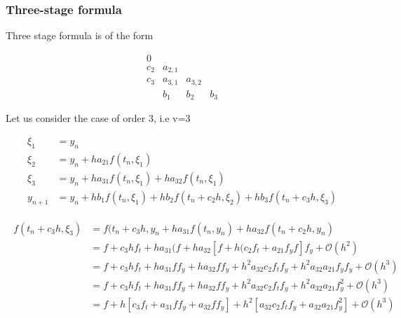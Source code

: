\documentclass[12pt,a4paper]{article}
\begin{document}
\subsubsection{Three-stage formula}

Three stage formula is of the form

\begin{equation*}
  \begin{array}{c|ccc}
    0       \\
    c_2       & a_{2,1}  \\
    c_3    & a_{3,1}   &  a_{3,2}  \\
    \hline
    \,        & b_1      & b_2     & b_3
  \end{array}
\end{equation*}

Let us consider the case of order 3, i.e v=3

\begin{align*}
\xi_1 &= y_n \\
\xi_2 &= y_n + ha_{21}f(t_n, \xi_1) \\
\xi_3 &= y_n + ha_{31}f(t_n, \xi_1) + ha_{32}f(t_n, \xi_1) \\
y_{n+1} &= y_n + hb_1f(t_n, \xi_1) + hb_2f(t_n + c_2h , \xi_2) + hb_3f(t_n + c_3h , \xi_3) 
\end{align*}

\begin{align*}
\begin{split}
f(t_n + c_3h, \xi_3) &= f(t_n + c_3h, y_n + ha_{31}f(t_n, y_n) + ha_{32}f(t_n + c_2h, y_n) \\
&=f + c_3hf_t + ha_{31} ( f + ha_{32}[ f + h (c_2 f_t + a_{21} f_yf ] f_y + \mathcal{O}(h^2) \\
&= f + c_3h f_t +  ha_{31} ff_y + ha_{32}ff_y + h^2 a_{32}c_2 f_t f_y + h^2a_{32}a_{21} f_yf_y + \mathcal{O}(h^3)\\
&= f + c_3hf_t +  ha_{31} ff_y + ha_{32}ff_y + h^2 a_{32}c_2 f_t f_y + h^2a_{32}a_{21}f_y^2 + \mathcal{O}(h^3)\\
&= f + h[ c_3 f_t + a_{31} ff_y + a_{32}ff_y ] + h^2 [a_{32}c_2 f_t f_y + a_{32}a_{21} f_y^2] + \mathcal{O}(h^3) 
\end{split}
\end{align*}
\end{document}
